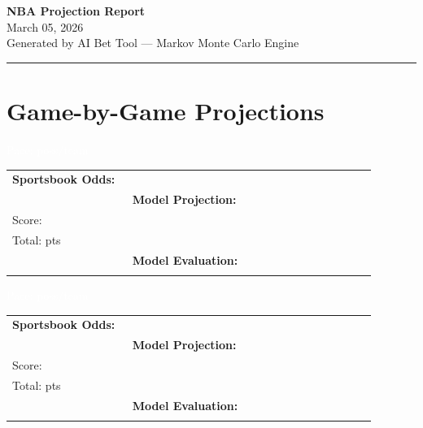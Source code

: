 \documentclass[10pt,a4paper]{article}
\begin{document}
\begin{center}
{\Huge\bfseries\textcolor{accent}{NBA Projection Report}}\\[4pt]
{\large\textcolor{accentgold}{March 05, 2026}}\\[2pt]
{\small\textcolor{midgray}{Generated by AI Bet Tool — Markov Monte Carlo Engine}}
\end{center}
\vspace{4pt}
\noindent\textcolor{accent}{\rule{\linewidth}{1.2pt}}
\vspace{6pt}

\newpage

\section*{Game-by-Game Projections}

\noindent\colorbox{matchupbar}{\parbox{\dimexpr\linewidth-2\fboxsep}{%
  \vspace{3pt}\hspace{4pt}{\bfseries\large\textcolor{white}{Houston Rockets @ Indiana Pacers}}
  \hfill{\small\textcolor{white}{Pace:  poss/team}}\vspace{3pt}
}}
\vspace{4pt}

\begin{tabular}{@{}p{0.32\linewidth}p{0.32\linewidth}p{0.33\linewidth}@{}}
\small
\textbf{Sportsbook Odds:} \\
&
\textbf{Model Projection:} \\
Score: \textbf{}\\
Total: \textbf{} pts\\
&
\textbf{Model Evaluation:} \\
\\
\end{tabular}

\vspace{8pt}

\noindent\colorbox{matchupbar}{\parbox{\dimexpr\linewidth-2\fboxsep}{%
  \vspace{3pt}\hspace{4pt}{\bfseries\large\textcolor{white}{Minnesota Timberwolves @ Memphis Grizzlies}}
  \hfill{\small\textcolor{white}{Pace:  poss/team}}\vspace{3pt}
}}
\vspace{4pt}

\begin{tabular}{@{}p{0.32\linewidth}p{0.32\linewidth}p{0.33\linewidth}@{}}
\small
\textbf{Sportsbook Odds:} \\
&
\textbf{Model Projection:} \\
Score: \textbf{}\\
Total: \textbf{} pts\\
&
\textbf{Model Evaluation:} \\
\\
\end{tabular}
\end{document}
